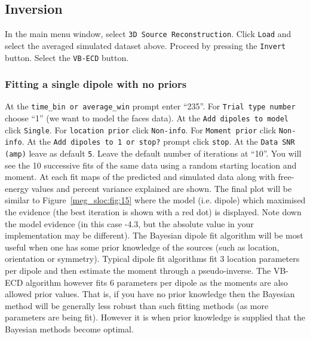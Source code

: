 \subsection{Inversion}
In the main menu window, select \texttt{3D Source Reconstruction}. Click \texttt{Load} and select the averaged simulated dataset above.
Proceed by pressing the \texttt{Invert} button. Select the \texttt{VB-ECD} button.

\subsubsection{Fitting a single dipole with no priors}
At the \texttt{time\_bin or average\_win} prompt enter ``235''. For \texttt{Trial type number} choose ``1'' (we want to model the faces data). At the \texttt{Add dipoles to model} click \texttt{Single}. For \texttt{location prior} click \texttt{Non-info}. For \texttt{Moment prior} click \texttt{Non-info}. At the \texttt{Add dipoles to 1 or stop?} prompt click \texttt{stop}. At the \texttt{Data SNR (amp)} leave as default \texttt{5}. Leave the default number of iterations at ``10''.
You will see the 10 successive fits of the same data using a random starting location and moment. At each fit maps of the predicted and simulated data along with free-energy values and percent variance explained are shown. The final plot will be similar to Figure~\ref{meg_sloc:fig:15} where the model (i.e. dipole) which maximised the evidence (the best iteration is shown with a red dot) is displayed. Note down the model evidence (in this case -4.3, but the absolute value in your implementation may be different). The Bayesian dipole fit algorithm will be most useful when one has some prior knowledge of the sources (such as location, orientation or symmetry). Typical dipole fit algorithms fit 3 location parameters per dipole and then estimate the moment through a pseudo-inverse. The VB-ECD algorithm however fits 6 parameters per dipole as the moments are also allowed prior values. That is, if you have no prior knowledge then the Bayesian method will be generally less robust than such fitting methods (as more parameters are being fit). However it is when prior knowledge is supplied that the Bayesian methods become optimal.

